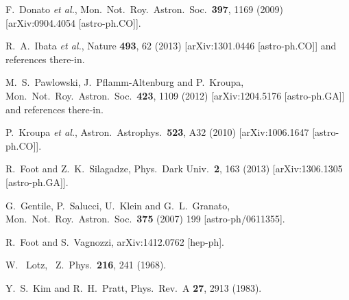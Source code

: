 \documentclass[12pt]{article}
\begin{document}
{{\begin{thebibliography}{999}
F.~Donato {\it et al.},
Mon.\ Not.\ Roy.\ Astron.\ Soc.\  {\bf 397}, 1169 (2009)
[arXiv:0904.4054 [astro-ph.CO]].

R.~A.~Ibata {\it et al.},
Nature {\bf 493}, 62 (2013)
[arXiv:1301.0446 [astro-ph.CO]] and references there-in.

M.~S.~Pawlowski, J.~Pflamm-Altenburg and P.~Kroupa,
Mon.\ Not.\ Roy.\ Astron.\ Soc.\  {\bf 423}, 1109 (2012)
[arXiv:1204.5176 [astro-ph.GA]] and references there-in.

P.~Kroupa {\it et al.},
Astron.\ Astrophys.\  {\bf 523}, A32 (2010) [arXiv:1006.1647
[astro-ph.CO]].



R.~Foot and Z.~K.~Silagadze,
Phys.\ Dark Univ.\  {\bf 2}, 163 (2013)
[arXiv:1306.1305 [astro-ph.GA]].

G.~Gentile, P.~Salucci, U.~Klein and G.~L.~Granato,
Mon.\ Not.\ Roy.\ Astron.\ Soc.\  {\bf 375} (2007) 199
[astro-ph/0611355].
  
  
R.~Foot and S.~Vagnozzi,
arXiv:1412.0762 [hep-ph].
   
W. ~Lotz, \ Z.\ Phys.\ {\bf 216}, 241 (1968).

Y.~S.~Kim and R.~H.~Pratt,
Phys.\ Rev.\ A {\bf 27}, 2913 (1983).
  

\end{thebibliography}}}
\end{document}
